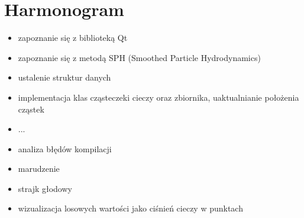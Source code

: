 \documentclass[a4paper]{article}
\begin{document}
\section{Harmonogram}
\begin{itemize}
  \item zapoznanie się z biblioteką Qt
  \item zapoznanie się z metodą SPH (Smoothed Particle Hydrodynamics)
  \item ustalenie struktur danych
  \item implementacja klas cząsteczeki cieczy oraz zbiornika, uaktualnianie położenia cząstek
  \item ...
  \item analiza błędów kompilacji
  \item marudzenie
  \item strajk głodowy
  \item wizualizacja losowych wartości jako ciśnień cieczy w punktach
\end{itemize}
\end{document}
